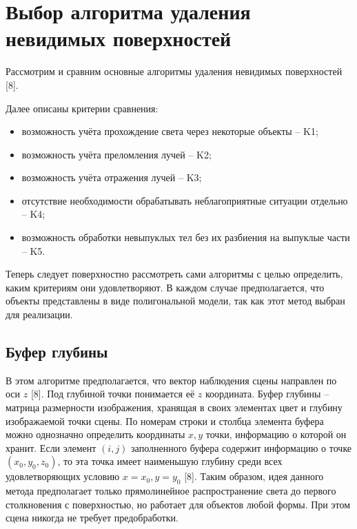 \section{Выбор алгоритма удаления невидимых поверхностей} {
    Рассмотрим и сравним основные алгоритмы удаления невидимых поверхностей [8].

    Далее описаны критерии сравнения:
    \begin{itemize}
        \item возможность учёта прохождение света через некоторые объекты -- K1;
        \item возможность учёта преломления лучей -- K2;
        \item возможность учёта отражения лучей -- K3;
        \item отсутствие необходимости обрабатывать неблагоприятные
        ситуации отдельно -- K4;
        \item возможность обработки невыпуклых тел без их разбиения
        на выпуклые части -- K5.
    \end{itemize}

    Теперь следует поверхностно рассмотреть сами алгоритмы с целью определить,
    каким критериям они удовлетворяют.
    В каждом случае предполагается, что объекты представлены в виде полигональной
    модели, так как этот метод выбран для реализации.

    \subsection{Буфер глубины} {
        В этом алгоритме предполагается, что вектор наблюдения сцены
        направлен по оси $z$ [8].
        Под глубиной точки понимается её $z$ координата.
        Буфер глубины -- матрица размерности изображения, хранящая
        в своих элементах цвет и глубину изображаемой точки сцены.
        По номерам строки и столбца элемента буфера можно однозначно определить
        координаты $x, y$ точки, информацию о которой он хранит.
        Если элемент $(i, j)$ заполненного буфера содержит информацию
        о точке $(x_0, y_0, z_0)$, то эта точка имеет наименьшую глубину
        среди всех удовлетворяющих условию $x = x_0, y = y_0$ [8].
        Таким образом, идея данного метода предполагает только прямолинейное
        распространение света до первого столкновения с поверхностью,
        но работает для объектов любой формы.
        При этом сцена никогда не требует предобработки.
    }

}
